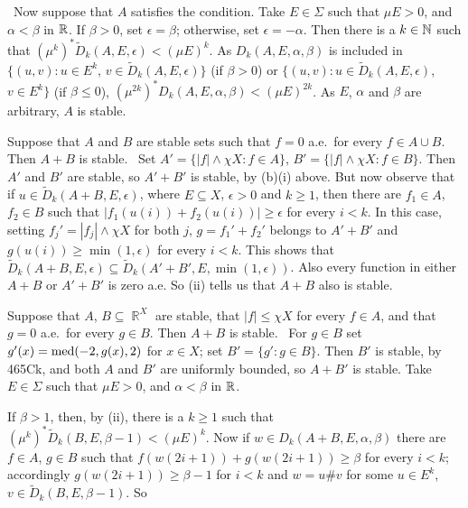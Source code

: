{\medskip

\qquad\grheadb\ Now suppose that $A$ satisfies the condition.
Take $E\in\Sigma$ such
that $\mu E>0$, and $\alpha<\beta$ in $\Bbb R$.   If $\beta>0$, set
$\epsilon=\beta$;  otherwise, set $\epsilon=-\alpha$.   Then there is a
$k\in\Bbb N$ such that $(\mu^k)^*\tilde D_k(A,E,\epsilon)<(\mu E)^k$.
As $D_k(A,E,\alpha,\beta)$ is included in
$\{(u,v):u\in E^k$, $v\in\tilde D_k(A,E,\epsilon)\}$ (if $\beta>0$) or
$\{(u,v):u\in\tilde D_k(A,E,\epsilon)$, $v\in E^k\}$ (if $\beta\le 0$),
$(\mu^{2k})^*D_k(A,E,\alpha,\beta)<(\mu E)^{2k}$.   As $E$, $\alpha$ and
$\beta$ are arbitrary, $A$ is stable.\ \Qed

\medskip

 Suppose that $A$ and $B$ are stable sets such that
$f=0$ a.e.\ for every $f\in A\cup B$.   Then $A+B$ is stable.   \Prf\ Set
$A'=\{|f|\wedge\chi X:f\in A\}$, $B'=\{|f|\wedge\chi X:f\in B\}$.   Then
$A'$ and $B'$ are stable, so $A'+B'$ is stable, by (b)(i) above.
But now observe that if $u\in\tilde D_k(A+B,E,\epsilon)$, where
$E\subseteq X$, $\epsilon>0$ and $k\ge 1$, then there are $f_1\in A$,
$f_2\in B$ such that $|f_1(u(i))+f_2(u(i))|\ge\epsilon$ for every $i<k$.
In this case, setting $f_j'=|f_j|\wedge\chi X$ for both $j$, $g=f_1'+f_2'$
belongs to $A'+B'$ and $g(u(i))\ge\min(1,\epsilon)$ for every $i<k$.
This shows that
$\tilde D_k(A+B,E,\epsilon)\subseteq\tilde D_k(A'+B',E,\min(1,\epsilon))$.
Also every function in either $A+B$ or $A'+B'$ is zero a.e.   So
(ii) tells us that $A+B$ also is stable.\ \Qed

\medskip

 Suppose that $A$, $B\subseteq\BbbR^X$ are stable, that
$|f|\le\chi X$ for every $f\in A$, and that $g=0$ a.e.\ for every $g\in B$.
Then $A+B$ is stable.   \Prf\ For $g\in B$ set
$g'(x)=\mathop{\text{med}}(-2,g(x),2)$
for $x\in X$;  set $B'=\{g':g\in B\}$.   Then $B'$ is stable, by 465Ck, and
both $A$ and $B'$ are uniformly bounded, so $A+B'$
is stable.   Take $E\in\Sigma$ such that $\mu E>0$, and
$\alpha<\beta$ in $\Bbb R$.

If $\beta>1$, then, by (ii), there is a $k\ge 1$ such that
$(\mu^k)^*\tilde D_k(B,E,\beta-1)<(\mu E)^k$.   Now if
$w\in D_k(A+B,E,\alpha,\beta)$ there are $f\in A$, $g\in B$ such that
$f(w(2i+1))+g(w(2i+1))\ge\beta$ for every $i<k$;  accordingly
$g(w(2i+1))\ge\beta-1$ for $i<k$ and $w=u\#v$ for some $u\in E^k$,
$v\in\tilde D_k(B,E,\beta-1)$.   So


}
